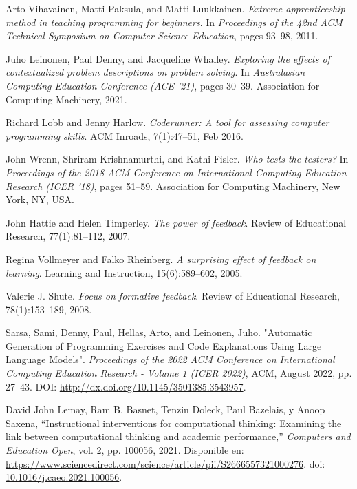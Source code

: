 \documentclass{article}
\begin{document}
\begin{thebibliography}{99}
Arto Vihavainen, Matti Paksula, and Matti Luukkainen.
\textit{Extreme apprenticeship method in teaching programming for beginners}.
In \textit{Proceedings of the 42nd ACM Technical Symposium on Computer Science Education}, pages 93--98, 2011.

Juho Leinonen, Paul Denny, and Jacqueline Whalley.
\textit{Exploring the effects of contextualized problem descriptions on problem solving}.
In \textit{Australasian Computing Education Conference (ACE '21)}, pages 30--39. Association for Computing Machinery, 2021.

Richard Lobb and Jenny Harlow.
\textit{Coderunner: A tool for assessing computer programming skills}.
ACM Inroads, 7(1):47--51, Feb 2016.

John Wrenn, Shriram Krishnamurthi, and Kathi Fisler.
\textit{Who tests the testers?}
In \textit{Proceedings of the 2018 ACM Conference on International Computing Education Research (ICER '18)}, pages 51--59. Association for Computing Machinery, New York, NY, USA.

John Hattie and Helen Timperley.
\textit{The power of feedback}.
Review of Educational Research, 77(1):81--112, 2007.

Regina Vollmeyer and Falko Rheinberg.
\textit{A surprising effect of feedback on learning}.
Learning and Instruction, 15(6):589--602, 2005.

Valerie J. Shute.
\textit{Focus on formative feedback}.
Review of Educational Research, 78(1):153--189, 2008.

 Sarsa, Sami, Denny, Paul, Hellas, Arto, and Leinonen, Juho. "Automatic Generation of Programming Exercises and Code Explanations Using Large Language Models". \textit{Proceedings of the 2022 ACM Conference on International Computing Education Research - Volume 1 (ICER 2022)}, ACM, August 2022, pp. 27–43. DOI: \url{http://dx.doi.org/10.1145/3501385.3543957}.

David John Lemay, Ram B. Basnet, Tenzin Doleck, Paul Bazelais, y Anoop Saxena, 
``Instructional interventions for computational thinking: Examining the link between computational thinking and academic performance,'' 
\textit{Computers and Education Open}, vol. 2, pp. 100056, 2021. 
Disponible en: \url{https://www.sciencedirect.com/science/article/pii/S2666557321000276}. 
doi: \href{https://doi.org/10.1016/j.caeo.2021.100056}{10.1016/j.caeo.2021.100056}.


\end{thebibliography}
\end{document}
